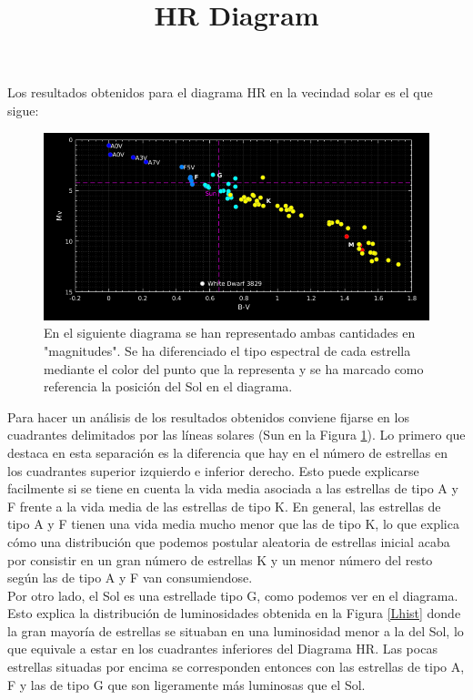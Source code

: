 \hspace*{12pt}Los resultados obtenidos para el diagrama HR en la vecindad solar es el que sigue:
	
	\begin{figure}[!htbp]
		\centering
		\title{\textbf{HR Diagram\vspace{2ex}}}
		\begin{center}
			\includegraphics[width=15cm]{Figures/HRdiagram2.png}
		\end{center}
		\caption{\footnotesize{En el siguiente diagrama se han representado ambas cantidades en "magnitudes". Se ha diferenciado el tipo espectral de cada estrella mediante el color del punto que la representa y se ha marcado como referencia la posici\'{o}n del Sol en el diagrama.}}
		\label{HRdiag}
		\end{figure}
		
	Para hacer un an\'{a}lisis de los resultados obtenidos conviene fijarse en los cuadrantes delimitados por las l\'{i}neas solares (Sun en la Figura \ref{HRdiag}). Lo primero que destaca en esta separaci\'{o}n es la diferencia que hay en el n\'{u}mero de estrellas en los cuadrantes superior izquierdo e inferior derecho. Esto puede explicarse facilmente si se tiene en cuenta la vida media asociada a las estrellas de tipo A y F frente a la vida media de las estrellas de tipo K. En general, las estrellas de tipo A y F tienen una vida media mucho menor que las de tipo K, lo que explica c\'{o}mo una distribuci\'{o}n que podemos postular aleatoria de estrellas inicial acaba por consistir en un gran n\'{u}mero de estrellas K y un menor n\'{u}mero del resto seg\'{u}n las de tipo A y F van consumiendose.
	\\ \hspace*{12pt}  Por otro lado, el Sol es una estrellade tipo G, como podemos ver en el diagrama. Esto explica la distribuci\'{o}n de luminosidades obtenida en la Figura \ref{Lhist} donde la gran mayor\'{i}a de estrellas se situaban en una luminosidad menor a la del Sol, lo que equivale a estar en los cuadrantes inferiores del Diagrama HR. Las pocas estrellas situadas por encima se corresponden entonces con las estrellas de tipo A, F y las de tipo G que son ligeramente más luminosas que el Sol. 
